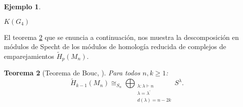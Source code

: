 \documentclass[12pt]{book}
\newtheorem{theorem}{Teorema}[section]
\theoremstyle{definition}
\newtheorem{example}[theorem]{Ejemplo}
\newcounter{in}
\newcounter{ini}
\begin{document}
\begin{example}
\begin{center}
\begin{minipage}{0.38\linewidth}

    $K(G_{4})$
  \end{minipage}
\end{center}
\end{example}
El teorema \ref{bouc} que se enuncia a continuación, nos muestra la descomposición en módulos de
Specht de los módulos de homología reducida de complejos de emparejamientos $\widetilde H_{p}(M_{n})$. 

\begin{theorem}[Teorema de Bouc, \cite{MR756517}]
Para todos $n,k\geq1$:
\begin{equation*}
  \widetilde H_{k-1}(M_{n})\cong_{S_{n}}\bigoplus_{\substack{\lambda:\lambda\vdash n\\
      \lambda=\lambda^{'}\\d(\lambda)=n-2k}} S^{\lambda}.
\end{equation*}
\label{bouc}
\end{theorem}
\end{document}
